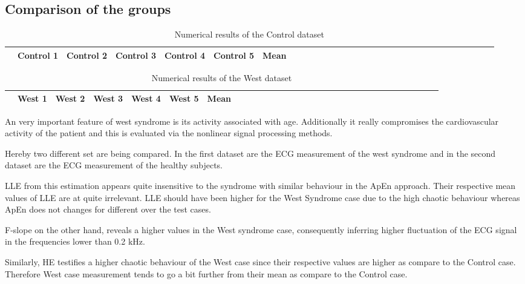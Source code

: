 \subsection{Comparison of the groups}

 \begin{table}[!htbp]
\centering
\caption{Numerical results of the Control dataset}

\begin{tabular}{c c c c c c c c c c c c c c c c c c c c c c c c c c c c c c c } 
\hline 
 &Control 1&Control 2&Control 3&Control 4&Control 5&Mean\\ 
\hline 
 


\hline 
\end{tabular}
\end{table}


 \begin{table}[!htbp]
\centering
\caption{Numerical results of the West dataset}

\begin{tabular}{c c c c c c c c c c c c c c c c c c c c c c c c c c c c c c c } 
\hline  
&West 1&West 2&West 3&West 4&West 5&Mean\\ 
\hline 

 


\hline 
\end{tabular}
\end{table}

An very important feature of west syndrome is its activity associated with age. Additionally it really compromises the cardiovascular activity of the patient and this is evaluated via the nonlinear signal processing methods.

Hereby two different set are being compared. In the first dataset are the ECG measurement of the west syndrome and in the second dataset are the ECG measurement of the healthy subjects.

LLE from this estimation appears quite insensitive to the syndrome with similar behaviour in the ApEn approach. Their respective mean values of LLE are at quite irrelevant.  LLE should have been higher for the West Syndrome case due to the high chaotic behaviour whereas ApEn does not changes for different over the test cases. 

F-slope on the other hand, reveals a higher values in the West syndrome case, consequently inferring higher fluctuation of the ECG signal in the frequencies lower than 0.2 kHz. 

Similarly, HE testifies a higher chaotic behaviour of the West case since their respective values are higher as compare to the Control case. Therefore West case measurement tends to go a bit further from their mean as compare to the Control case.

